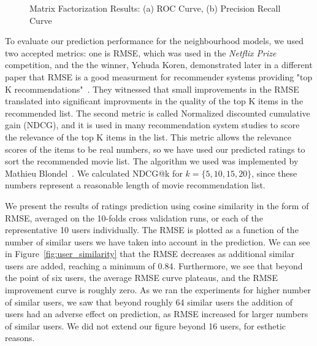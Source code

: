 \begin{figure}
{\begin{tabular}{c c}
\end{tabular}
}
\caption{Matrix Factorization Results: (a) ROC Curve, (b) Precision Recall Curve}
\label{fig:matrix_curves}  
\end{figure}


To evaluate our prediction performance for the neighbourhood models, we used two accepted metrics: one is RMSE, which was used in the \textit{Netflix Prize} competition, and the the winner, Yehuda Koren, demonstrated later in a different paper that RMSE is a good measurment for recommender systems providing "top K recommendations"~\cite{koren2008factorization}. They witnessed that small improvements in the RMSE translated into significant improvments in the quality of the top K items in the recommended list. The second metric is called Normalized discounted cumulative gain (NDCG), and it is used in many recommendation system studies to score the relevance of the top K items in the list. This metric allows the relevance scores of the items to be real numbers, so we have used our predicted ratings to sort the recommended movie list. The algorithm we used was implemented by Mathieu Blondel~\cite{letorMetrics}. We calculated NDCG@k for $k=\{5, 10, 15, 20\}$, since these numbers represent a reasonable length of movie recommendation list.

We present the results of ratings prediction using cosine similarity in the form of RMSE, averaged on the 10-folds cross validation runs, or each of the representative 10 users individually. 
The RMSE is plotted as a function of the number of similar users we have taken into account in the prediction. 
We can see in Figure~\ref{fig:user_similarity} that the RMSE decreases as additional similar users are added, reaching a minimum of 0.84.
Furthermore, we see that beyond the point of six users, the average RMSE curve plateaus, and the RMSE improvement curve is roughly zero.
As we ran the experiments for higher number of similar users, we saw that beyond roughly 64 similar users the addition of users had an adverse effect on prediction, as RMSE increased for larger numbers of similar users. We did not extend our figure beyond 16 users, for esthetic reasons. 

